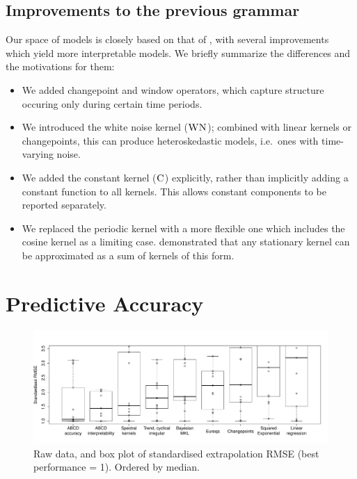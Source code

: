 \documentclass[letterpaper]{article}
\begin{document}
\subsection{Improvements to the previous grammar}

Our space of \gp{} models is closely based on that of \citet{DuvLloGroetal13}, with several improvements which yield more interpretable models. We briefly summarize the differences and the motivations for them:
\begin{itemize}
\item We added changepoint and window operators, which capture structure occuring only during certain time periods.
\item We introduced the white noise kernel (${\textsc{WN}}$); combined with linear kernels or changepoints, this can produce heteroskedastic models, i.e.~ones with time-varying noise.
\item We added the constant kernel (${\textsc{C}}$) explicitly, rather than implicitly adding a constant function to all kernels. This allows constant components to be reported separately.%
\item We replaced the periodic kernel with a more flexible one which includes the cosine kernel as a limiting case. \citet{bochner1959lectures} demonstrated that any stationary kernel can be approximated as a sum of kernels of this form.
\end{itemize}




\section{Predictive Accuracy}
\label{sec:numerical}

\begin{figure}[ht]
\centering
\includegraphics[width=\textwidth]{figures/box_extrap_wide}
\vspace{-0.8cm}
\caption{
Raw data, and box plot of standardised extrapolation RMSE (best performance = 1).
Ordered by median.
}
\label{fig:box_extrap_dist}
\end{figure}
\end{document}
